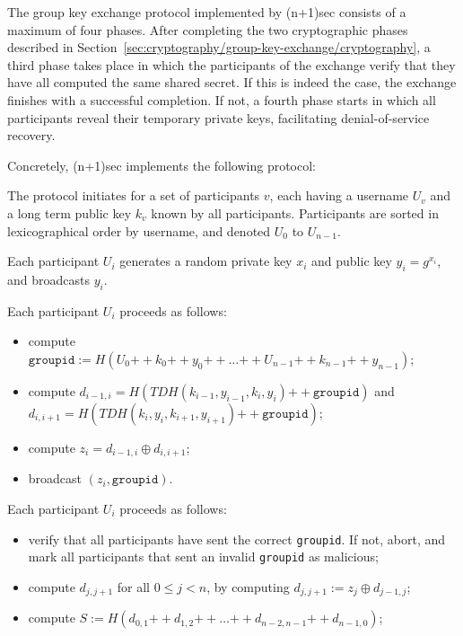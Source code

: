 \documentclass{article}
\def\concat{\mathbin{+\!\!\!+}}
\def\xor{\oplus}
\begin{document}
The group key exchange protocol implemented by (n+1)sec consists of a maximum of four phases.
After completing the two cryptographic phases described in Section~\ref{sec:cryptography/group-key-exchange/cryptography}, a third phase takes place in which the participants of the exchange verify that they have all computed the same shared secret.
If this is indeed the case, the exchange finishes with a successful completion.
If not, a fourth phase starts in which all participants reveal their temporary private keys, facilitating denial-of-service recovery.

Concretely, (n+1)sec implements the following protocol:
\begin{description}[noitemsep]
\item[Participants.] The protocol initiates for a set of participants $v$, each having a username $U_v$ and a long term public key $k_v$ known by all participants. Participants are sorted in lexicographical order by username, and denoted $U_0$ to $U_{n-1}$.
\item[Round 1.] Each participant $U_i$ generates a random private key $x_i$ and public key $y_i = g^{x_i}$, and broadcasts $y_i$.
\item[Round 2.] Each participant $U_i$ proceeds as follows:
	\begin{itemize}[noitemsep,nolistsep]\renewcommand{\labelitemi}{--}
	\item compute $\texttt{groupid} := H(U_0 \concat k_0 \concat y_0 \concat \ldots \concat U_{n-1} \concat k_{n-1} \concat y_{n-1})$;
	\item compute $d_{i-1, i} = H(TDH(k_{i-1}, y_{i-1}, k_i, y_i) \concat \texttt{groupid})$ and $d_{i, i+1} = H(TDH(k_i, y_i, k_{i+1}, y_{i+1}) \concat \texttt{groupid})$;
	\item compute $z_i = d_{i-1, i} \xor d_{i, i+1}$;
	\item broadcast $(z_i, \texttt{groupid})$.
	\end{itemize}
\item[Round 3.] Each participant $U_i$ proceeds as follows:
	\begin{itemize}[noitemsep,nolistsep]\renewcommand{\labelitemi}{--}
	\item verify that all participants have sent the correct \texttt{groupid}. If not, abort, and mark all participants that sent an invalid \texttt{groupid} as malicious;
	\item compute $d_{j, j+1}$ for all $0 \leq j < n$, by computing $d_{j, j+1} := z_j \xor d_{j-1, j}$;
	\item compute $S := H(d_{0, 1} \concat d_{1, 2} \concat \ldots \concat d_{n-2, n-1} \concat d_{n-1, 0})$;

\end{itemize}
\end{description}
\end{document}
